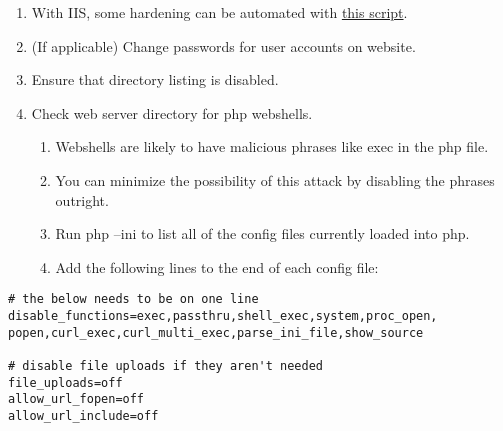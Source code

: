 \documentclass[12pt,letterpaper]{article}
\begin{document}
\begin{enumerate}
	\item With IIS, some hardening can be automated with \href{https://github.com/ufsitblue/blue/blob/main/dsu_blue/windows/IIS.ps1}{this script}.
	\item (If applicable) Change passwords for user accounts on website.
	\item Ensure that directory listing is disabled.
	\item Check web server directory for php webshells.
	\begin{enumerate}
		\item Webshells are likely to have malicious phrases like exec in the php file.
		\item You can minimize the possibility of this attack by disabling the phrases outright.
		\item Run php --ini to list all of the config files currently loaded into php.
		\item Add the following lines to the end of each config file:
	\end{enumerate}	
\end{enumerate}

\begin{verbatim}
# the below needs to be on one line
disable_functions=exec,passthru,shell_exec,system,proc_open,
popen,curl_exec,curl_multi_exec,parse_ini_file,show_source

# disable file uploads if they aren't needed
file_uploads=off
allow_url_fopen=off
allow_url_include=off
\end{verbatim}
\end{document}
